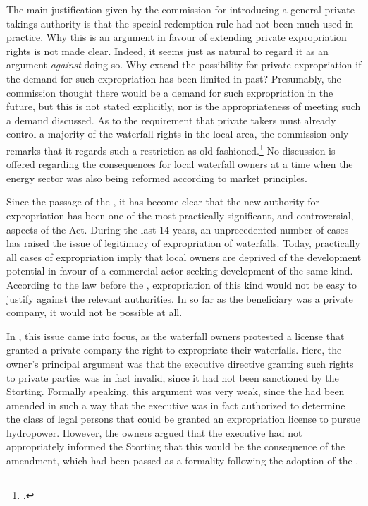 The main justification given by the commission for introducing a general private takings authority is that the special redemption rule had not been much used in practice. Why this is an argument in favour of extending private expropriation rights is not made clear. Indeed, it seems just as natural to regard it as an argument {\it against} doing so. Why extend the possibility for private expropriation if the demand for such expropriation has been limited in past? Presumably, the commission thought there would be a demand for such expropriation in the future, but this is not stated explicitly, nor is the appropriateness of meeting such a demand discussed. As to the requirement that private takers must already control a majority of the waterfall rights in the local area, the commission only remarks that it regards such a restriction as old-fashioned.\footcite[236]{nou94} No discussion is offered regarding the consequences for local waterfall owners at a time when the energy sector was also being reformed according to market principles.

Since the passage of the \cite{wra00}, it has become clear that the new authority for expropriation has been one of the most practically significant, and controversial, aspects of the Act. During the last 14 years, an unprecedented number of cases has raised the issue of legitimacy of expropriation of waterfalls. Today, practically all cases of expropriation imply that local owners are deprived of the development potential in favour of a commercial actor seeking development of the same kind. According to the law before the \cite{wra00}, expropriation of this kind would not be easy to justify against the relevant authorities. In so far as the beneficiary was a private company, it would not be possible at all. 

In \cite{sauda08}, this issue came into focus, as the waterfall owners protested a license that granted a private company the right to expropriate their waterfalls. Here, the owner's principal argument was that the executive directive granting such rights to private parties was in fact invalid, since it had not been sanctioned by the Storting. Formally speaking, this argument was very weak, since the \cite{ea59} had been amended in such a way that the executive was in fact authorized to determine the class of legal persons that could be granted an expropriation license to pursue hydropower. However, the owners argued that the executive had not appropriately informed the Storting that this would be the consequence of the amendment, which had been passed as a formality following the adoption of the \cite{wra00}. 

